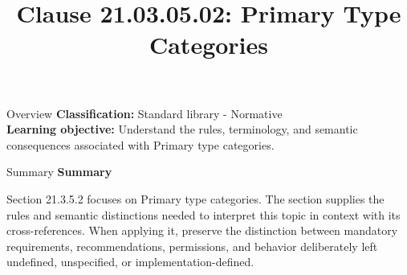 \documentclass[10pt,letterpaper]{article}
\title{Clause 21.03.05.02: Primary Type Categories}
\author{}
\date{}
\begin{document}
\maketitle
\begin{CornellOverviewBox}{Overview}
\textbf{Classification:} Standard library - Normative\\[2pt]
\textbf{Learning objective:} Understand the rules, terminology, and semantic consequences associated with Primary type categories.
\end{CornellOverviewBox}\begin{CornellSummaryBox}{Summary}
{\sffamily\bfseries\color{Accent} Summary}\par\vspace{3pt}Section 21.3.5.2 focuses on Primary type categories. The section supplies the rules and semantic distinctions needed to interpret this topic in context with its cross-references. When applying it, preserve the distinction between mandatory requirements, recommendations, permissions, and behavior deliberately left undefined, unspecified, or implementation-defined.
\end{CornellSummaryBox}
\end{document}

